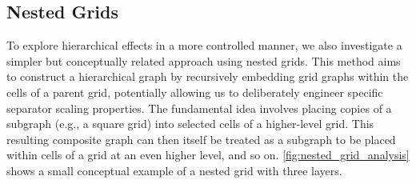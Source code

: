 \subsection{Nested Grids}

To explore hierarchical effects in a more controlled manner, we also investigate a simpler but conceptually related approach using nested grids.
This method aims to construct a hierarchical graph by recursively embedding grid graphs within the cells of a parent grid, potentially allowing us to deliberately engineer specific separator scaling properties.
The fundamental idea involves placing copies of a subgraph (e.g., a square grid) into selected cells of a higher-level grid.
This resulting composite graph can then itself be treated as a subgraph to be placed within cells of a grid at an even higher level, and so on.
\cref{fig:nested_grid_analysis} shows a small conceptual example of a nested grid with three layers.

